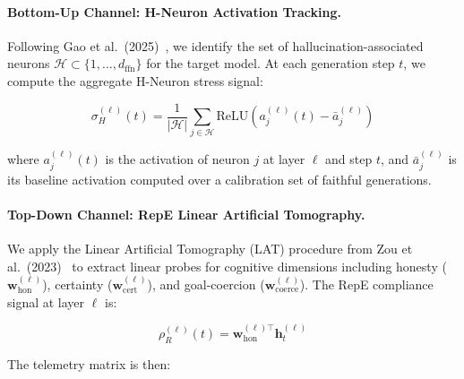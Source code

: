 \documentclass{article}
\begin{document}
\paragraph{Bottom-Up Channel: H-Neuron Activation Tracking.}
Following Gao et al.\ (2025)~\cite{gao2025hneurons}, we identify the set of hallucination-associated neurons $\mathcal{H} \subset \{1, \ldots, d_{\text{ffn}}\}$ for the target model. At each generation step $t$, we compute the aggregate H-Neuron stress signal:

\begin{equation}
\sigma_H^{(\ell)}(t) = \frac{1}{|\mathcal{H}|} \sum_{j \in \mathcal{H}} \text{ReLU}\left(a_j^{(\ell)}(t) - \bar{a}_j^{(\ell)}\right)
\label{eq:hneuron_stress}
\end{equation}

where $a_j^{(\ell)}(t)$ is the activation of neuron $j$ at layer $\ell$ and step $t$, and $\bar{a}_j^{(\ell)}$ is its baseline activation computed over a calibration set of faithful generations.


\paragraph{Top-Down Channel: RepE Linear Artificial Tomography.}
We apply the Linear Artificial Tomography (LAT) procedure from Zou et al.\ (2023)~\cite{zou2023repe} to extract linear probes for cognitive dimensions including honesty ($\mathbf{w}_{\text{hon}}^{(\ell)}$), certainty ($\mathbf{w}_{\text{cert}}^{(\ell)}$), and goal-coercion ($\mathbf{w}_{\text{coerce}}^{(\ell)}$). The RepE compliance signal at layer $\ell$ is:

\begin{equation}
\rho_R^{(\ell)}(t) = \mathbf{w}_{\text{hon}}^{(\ell)\top} \mathbf{h}_t^{(\ell)}
\label{eq:repe_signal}
\end{equation}

The telemetry matrix is then:
\end{document}
